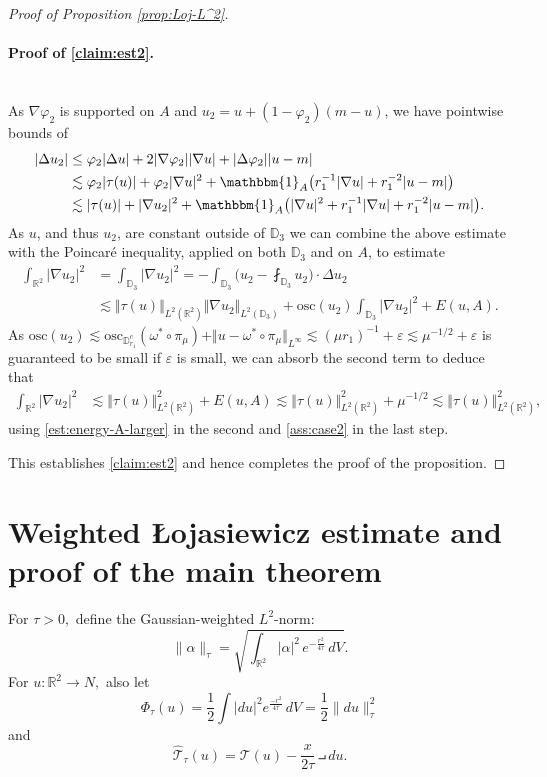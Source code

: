\documentclass[10pt,reqno]{amsart}
\theoremstyle{plain}
\theoremstyle{definition}
\numberwithin{equation}{section}
\newcommand{\om}{\omega}
\newcommand{\D}{\mathbb{D}}
\newcommand{\R}{\ensuremath{{\mathbb R}}}
\newcommand{\osc}{\text{osc}}
\newcommand{\T}{{\mathcal T}}
\newcommand{\That}{{ \widehat{\T} }}
\newcommand{\norm}[1]{\Vert#1\Vert}
\newcommand{\beqas}{\begin{equation*}\begin{aligned}}
\newcommand{\eeqas}{\end{aligned}\end{equation*}}
\newcommand{\leqs}{\lesssim}
\newcommand{\abs}[1]{\vert#1\vert}
\newcommand{\eps}{\varepsilon}
\newcommand{\na}{\nabla}
\begin{document}
\begin{proof}[Proof of Proposition \ref{prop:Loj-L^2}]
\paragraph{\textbf{Proof of \eqref{claim:est2}.}}
$ $\\
As $\na \varphi_2$ is supported on $A$ and  $u_2=u+(1-\varphi_2)(m-u)$, we have
pointwise bounds of 
\beqas
|\Delta u_2|
&\leq\varphi_2
|\Delta u|+2
|\na\varphi_2||\na u|+
|\Delta\varphi_2||u-m|
\\
&\leqs
\varphi_2|\tau(u)|
+
\varphi_2|\na u|^2
+
\mathbbm{1}_A\bigl(r_1^{-1}|\na u|+r_1^{-2}|u-m|\bigr)\\
&\leqs
|\tau(u)|
+
|\na u_2|^2
+
\mathbbm{1}_A\bigl(|\na u|^2+r_1^{-1}|\na u|+r_1^{-2}|u-m|\bigr).
\eeqas
As $u$, and thus $u_2$, are constant outside of $\D_3$ we can combine the above estimate with the Poincar\'e inequality, applied on both $\D_3$ and on $A$, to estimate
\beqas
\int_{\R^2}|\na u_2|^2&=\int_{\D_3}|\na u_2|^2
=
-\int_{\D_3}
\bigl(u_2-\fint_{\D_3}u_2\bigr)\cdot\Delta u_2
\\
&\leqs
\norm{\tau(u)}_{L^2(\R^2)}
\norm{\na u_2}_{L^2(\D_3)}
+\osc(u_2) \int_{\D_3} \abs{\na u_2}^2+E(u,A).
\eeqas
As $\osc(u_2)\leqs
\osc_{\D_{r_1}^c}(\om^*\circ\pi_\mu)+\norm{u-\om^*\circ\pi_{\mu}}_{L^\infty}\leqs (\mu r_1)^{-1}+\eps\leqs \mu^{-1/2}+\eps$ is guaranteed to be small if $\eps$ is small, we can  absorb the second term 
to deduce that
\beqas
\int_{\R^2}|\na u_2|^2
&\leqs
\norm{\tau(u)}_{L^2(\R^2)}^2 
+
E(u,A)\leqs \norm{\tau(u)}_{L^2(\R^2)}^2 +\mu^{-1/2} \leqs\norm{\tau(u)}_{L^2(\R^2)}^2, 
\eeqas
using \eqref{est:energy-A-larger} in the second and 
\eqref{ass:case2} in the last step. 

This establishes \eqref{claim:est2} and hence completes the proof of the proposition.
\end{proof}



\section{Weighted \L ojasiewicz estimate and proof of the main theorem}
For $\tau > 0,$ define the Gaussian-weighted $L^2$-norm:
\begin{equation*}
\| \alpha \|_\tau = \sqrt{ \int_{\R^2} |\alpha |^2 \, e^{-\frac{r^2}{4\tau} } \, dV }.
\end{equation*}
For $u : \R^2 \to N,$ also let
$$\Phi_\tau(u) = \frac12 \int |du|^2 e^{ \frac{-r^2}{4 \tau} } \, dV = \frac12 \| du \|_{\tau}^2$$
and
$$\That_\tau(u) = \T(u) - \frac{x}{2 \tau} \intprod du.$$
\end{document}
